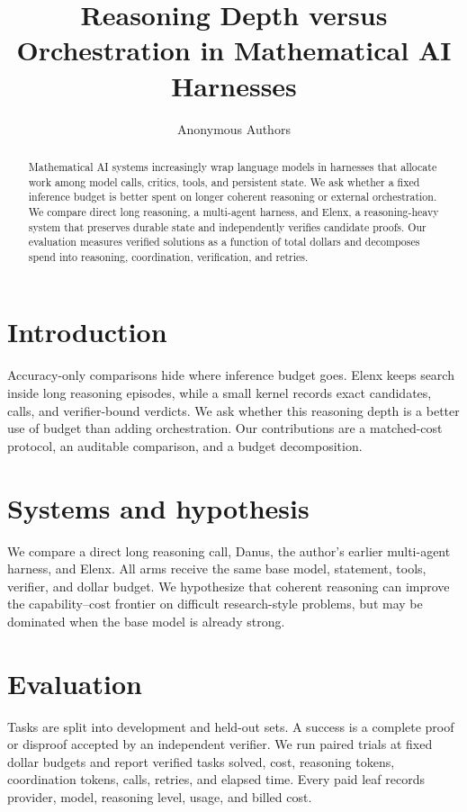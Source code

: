 \documentclass{article}
\title{Reasoning Depth versus Orchestration in Mathematical AI Harnesses}
\author{Anonymous Authors}
\begin{document}
\maketitle
\begin{abstract}Mathematical AI systems increasingly wrap language models in harnesses that allocate work among model calls, critics, tools, and persistent state. We ask whether a fixed inference budget is better spent on longer coherent reasoning or external orchestration. We compare direct long reasoning, a multi-agent harness, and Elenx, a reasoning-heavy system that preserves durable state and independently verifies candidate proofs. Our evaluation measures verified solutions as a function of total dollars and decomposes spend into reasoning, coordination, verification, and retries.\end{abstract}
\section{Introduction}Accuracy-only comparisons hide where inference budget goes. Elenx keeps search inside long reasoning episodes, while a small kernel records exact candidates, calls, and verifier-bound verdicts. We ask whether this reasoning depth is a better use of budget than adding orchestration. Our contributions are a matched-cost protocol, an auditable comparison, and a budget decomposition.
\section{Systems and hypothesis}We compare a direct long reasoning call, Danus, the author's earlier multi-agent harness, and Elenx. All arms receive the same base model, statement, tools, verifier, and dollar budget. We hypothesize that coherent reasoning can improve the capability--cost frontier on difficult research-style problems, but may be dominated when the base model is already strong.
\section{Evaluation}Tasks are split into development and held-out sets. A success is a complete proof or disproof accepted by an independent verifier. We run paired trials at fixed dollar budgets and report verified tasks solved, cost, reasoning tokens, coordination tokens, calls, retries, and elapsed time. Every paid leaf records provider, model, reasoning level, usage, and billed cost.
\end{document}
